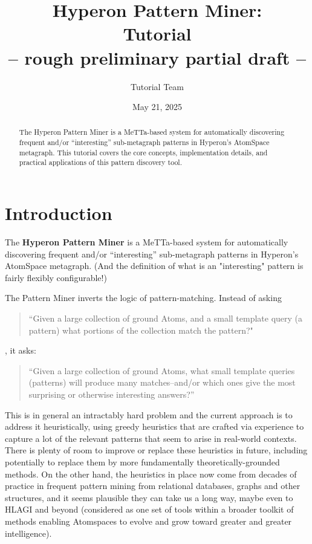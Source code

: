 \documentclass{article}
\title{Hyperon Pattern Miner: \\ Tutorial \\ {\bf \small -- rough preliminary partial draft -- }}
\author{Tutorial Team}
\date{May 21, 2025}
\begin{document}
\maketitle

\begin{abstract}
The Hyperon Pattern Miner is a MeTTa-based system for automatically discovering frequent and/or ``interesting'' sub-metagraph patterns in Hyperon's AtomSpace metagraph. This tutorial covers the core concepts, implementation details, and practical applications of this pattern discovery tool.
\end{abstract}

\tableofcontents

\section{Introduction}

The \textbf{Hyperon Pattern Miner} is a MeTTa-based system for automatically discovering  frequent and/or ``interesting''  sub-metagraph patterns in Hyperon's AtomSpace metagraph.   (And the definition of what is an "interesting" pattern is fairly flexibly configurable!)

The Pattern Miner inverts the logic of pattern-matching.   Instead of asking

\begin{quote}
``Given a large collection of ground Atoms, and a small template query (a pattern) what portions of the collection match the pattern?"
\end{quote}

\noindent, it asks:

\begin{quote}
``Given a large collection of ground Atoms, what small template queries (patterns) will produce many matches--and/or which ones give the most surprising or otherwise interesting answers?''
\end{quote}

This is in general an intractably hard problem and the current approach is to address it heuristically, using greedy heuristics that are crafted via experience to capture a lot of the relevant patterns that seem to arise in real-world contexts.   There is plenty of room to improve or replace these heuristics in future, including potentially to replace them by more fundamentally theoretically-grounded methods.   On the other hand, the heuristics in place now come from decades of practice in frequent pattern mining from relational databases, graphs and other structures, and it seems plausible they can take us a long way, maybe even to HLAGI and beyond (considered as one set of tools within a broader toolkit of methods enabling Atomspaces to evolve and grow toward greater and greater intelligence).
\end{document}
